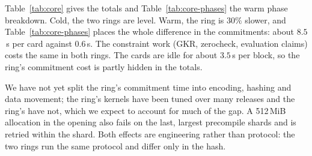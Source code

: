 Table~\ref{tab:core} gives the totals and Table~\ref{tab:core-phases} the warm phase breakdown. Cold, the two rings are level. Warm, the \Blake{} ring is $30\%$ slower, and Table~\ref{tab:core-phases} places the whole difference in the \WHIR{} commitments: about $8.5$\,s per card against $0.6$\,s. The constraint work (GKR, zerocheck, evaluation claims) costs the same in both rings. The \Poseidon{} cards are idle for about $3.5$\,s per block, so the \Blake{} ring's commitment cost is partly hidden in the totals.

We have not yet split the \Blake{} ring's commitment time into encoding, hashing and data movement; the \Poseidon{} ring's kernels have been tuned over many releases and the \Blake{} ring's have not, which we expect to account for much of the gap. A 512\,MiB allocation in the \WHIR{} opening also fails on the last, largest precompile shards and is retried within the shard. Both effects are engineering rather than protocol: the two rings run the same protocol and differ only in the hash.
